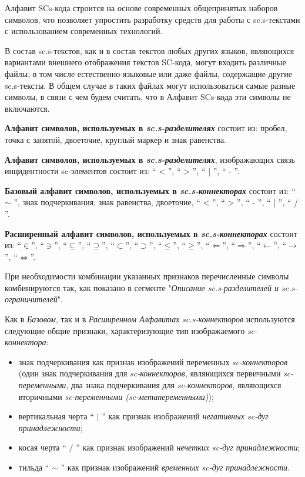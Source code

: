 Алфавит SCs-кода строится на основе современных общепринятых наборов символов, что позволяет упростить разработку средств для работы с sc.s-текстами с использованием современных технологий.

В состав sc.s-текстов, как и в состав текстов любых других языков, являющихся вариантами внешнего отображения текстов SC-кода, могут входить различные файлы, в том числе естественно-языковые или даже файлы, содержащие другие sc.s-тексты. В общем случае в таких файлах могут использоваться самые разные символы, в связи с чем будем считать, что в Алфавит SCs-кода эти символы не включаются.


\textbf{Алфавит символов, используемых в \textit{sc.s-разделителях}} состоит из: пробел, точка с запятой, двоеточие, круглый маркер и знак равенства.


\textbf{Алфавит символов, используемых в \textit{sc.s-разделителях}}, изображающих связь инцидентности sc-элементов состоит из: `` < ''{}, `` > ''{}, `` | ''{}, `` - ''{}.

\textbf{Базовый алфавит символов, используемых в \textit{sc.s-коннекторах}} состоит из: `` $\sim$ ''{}, знак подчеркивания, знак равенства, двоеточие, `` < ''{}, `` > ''{}, `` - ''{}, `` | ''{}, `` / ''{}.
	
\textbf{Расширенный алфавит символов, используемых в \textit{sc.s-коннекторах}} состоит из:
	``$\in$''{}, 
	``$\ni$''{}, ``$\subseteq$''{}, ``$\supseteq$''{},   ``$\subset$''{}, ``$\supset$''{}, ``$\leq$''{},  ``$\geq$''{}, ``$\Leftarrow$''{}, ``$\Rightarrow$''{}, ``$\leftarrow$''{}, ``$\rightarrow$''{}, 
	``$\Leftrightarrow$''{}.

При необходимости комбинации указанных признаков перечисленные символы комбинируются так, как показано в сегменте "\textit{Описание sc.s-разделителей и sc.s-ограничителей}".

 Как в \textit{Базовом}, так и в \textit{Расширенном Алфавитах} \textit{sc.s-коннекторов} используются следующие общие признаки, характеризующие тип изображаемого \textit{sc-коннектора}:
\begin{itemize}
	\item знак подчеркивания как признак изображений переменных \textit{sc-коннекторов} (один знак подчеркивания для \textit{sc-коннекторов}, являющихся первичными \textit{sc-переменными}, два знака подчеркивания для \textit{sc-коннекторов}, являющихся вторичными \textit{sc-переменными (sc-метапеременными)});
	\item вертикальная черта `` $ | $ ''{} как признак изображений \textit{негативных sc-дуг принадлежности}; 
	\item косая черта `` $ / $ ''{} как признак изображений \textit{нечетких sc-дуг принадлежности};
	\item тильда `` $ \sim $ ''{} как признак изображений \textit{временных sc-дуг принадлежности}.   
\end{itemize}

